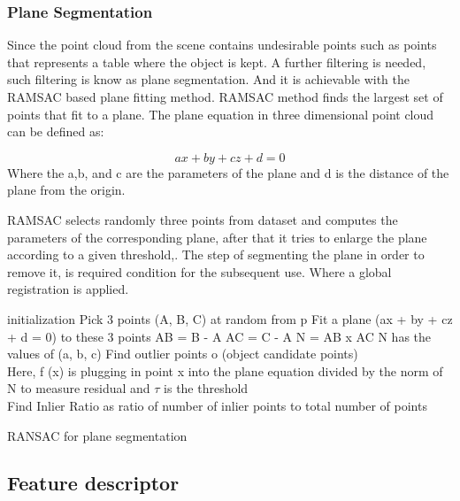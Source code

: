 \subsubsection{Plane Segmentation}
Since the point cloud from the scene contains undesirable points such as points that represents a table where the object is kept. A further filtering is needed, such filtering is know as plane segmentation. And it is achievable with the RAMSAC based plane fitting method. RAMSAC method finds the largest set of points that fit to a plane. The plane equation in three dimensional point cloud can be defined as:

\begin{equation}
    ax+by+cz+d=0
\end{equation}
Where the a,b, and c are the parameters of the plane and d is the distance of the plane from the origin.

RAMSAC selects randomly three points from dataset and computes the parameters of the corresponding plane, after that it tries to enlarge the plane according to a given threshold,\cite{algPlane}. The step of segmenting the plane in order to remove it, is required condition for the subsequent use. Where a global registration is applied. 
\\

\begin{algorithm}[H]
\SetAlgoLined
{}
 initialization\;
 {
 Pick 3 points (A, B, C) at random from p \;
 Fit a plane (ax + by + cz + d = 0) to these 3 points\;
    AB = B - A\;
    AC = C - A\;
    N = AB x AC\;
    N has the values of (a, b, c)\;
    Find outlier points o (object candidate points)\\
    Here, f (x) is plugging in point x into the plane equation divided by the norm of N to measure residual and $\tau$ is the threshold\\
    Find Inlier Ratio as ratio of number of inlier points to total number of points
}
\caption{RANSAC for plane segmentation \cite{cadPipeline3}}
\end{algorithm}



\subsection{Feature descriptor}

